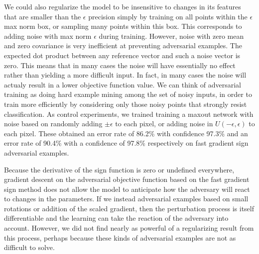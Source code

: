 \documentclass{article} %
\def\eps{{\epsilon}}
\begin{document}
We could also regularize the model to be insensitive to changes in its features that are smaller than the
$\eps$ precision simply by training on all points within the $\eps$ max norm box, or sampling many
points within this box. This corresponds to adding noise with max norm $\eps$ during training. However, noise with
zero mean and zero covariance is very inefficient at preventing adversarial examples. The expected dot product
between any reference vector and such a noise vector is zero. This means that in many cases the noise will have
essentially no effect rather than yielding a more difficult input. In fact, in many cases the noise will actualy result
in a lower objective function value. We can think of adversarial training as doing hard example mining among the set
of noisy inputs, in order to train more efficiently by considering only those noisy points that strongly resist
classification. As control experiments, we trained training a maxout network with noise based on randomly adding $\pm \eps$
to each pixel, or adding noise in $U(-\eps, \eps)$ to each pixel. These obtained an error rate of 86.2\% with confidence
97.3\% and an error rate of 90.4\% with a confidence of 97.8\% respectively on fast gradient sign adversarial examples.

Because the derivative of the sign function is zero or undefined everywhere, gradient descent on
the adversarial objective function based on the fast gradient sign method does
not allow the model to anticipate how the adversary will react to changes in the parameters.
If we instead adversarial examples based on small rotations or addition of the scaled gradient, then
the perturbation process is itself differentiable and the learning can take the reaction of the
adversary into account. However, we did not find nearly as powerful of a regularizing result from this
process, perhaps because these kinds of adversarial examples are not as difficult to solve.
\end{document}

